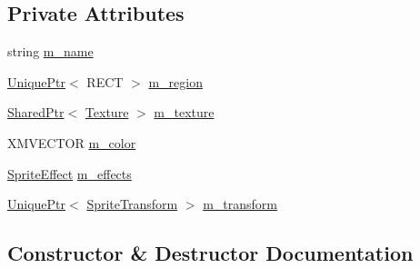 \subsection*{Private Attributes}
\begin{DoxyCompactItemize}
\item 
string \hyperlink{classmage_1_1_sprite_image_af172c204ee34926cc1dbead8351de817}{m\+\_\+name}
\item 
\hyperlink{namespacemage_a8c307fbcc33bce9b7f2aa4c26c3b95cf}{Unique\+Ptr}$<$ R\+E\+CT $>$ \hyperlink{classmage_1_1_sprite_image_a936aed1b97b91378724702c33eaf30be}{m\+\_\+region}
\item 
\hyperlink{namespacemage_a1e01ae66713838a7a67d30e44c67703e}{Shared\+Ptr}$<$ \hyperlink{classmage_1_1_texture}{Texture} $>$ \hyperlink{classmage_1_1_sprite_image_a8416fc862782dc019e15275261e7ca15}{m\+\_\+texture}
\item 
X\+M\+V\+E\+C\+T\+OR \hyperlink{classmage_1_1_sprite_image_addcc45aefcf29e2c62d48fd6b2751d7d}{m\+\_\+color}
\item 
\hyperlink{namespacemage_a9cfe18123066ba4236f548f9de75d881}{Sprite\+Effect} \hyperlink{classmage_1_1_sprite_image_a4233e0143d4dd0b609e38f5cbd3aef98}{m\+\_\+effects}
\item 
\hyperlink{namespacemage_a8c307fbcc33bce9b7f2aa4c26c3b95cf}{Unique\+Ptr}$<$ \hyperlink{structmage_1_1_sprite_transform}{Sprite\+Transform} $>$ \hyperlink{classmage_1_1_sprite_image_adcb9c0c4437cc9fe90957044cb8b76c0}{m\+\_\+transform}
\end{DoxyCompactItemize}


\subsection{Constructor \& Destructor Documentation}
\hypertarget{classmage_1_1_sprite_image_a0b18feb55a4a9c2c8ac5fad2a3fbf1cb}{}\label{classmage_1_1_sprite_image_a0b18feb55a4a9c2c8ac5fad2a3fbf1cb} 
